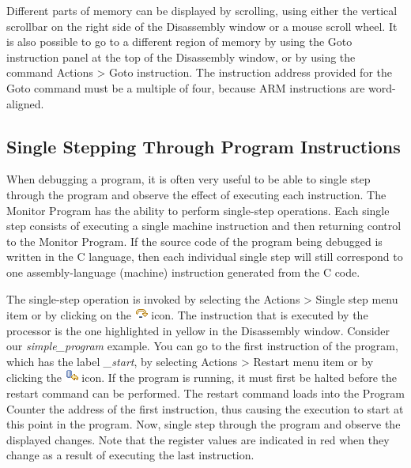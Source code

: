 \documentclass[11pt, twoside, pdftex]{article}
\begin{document}
Different parts of memory can be displayed by scrolling, 
using either the vertical scrollbar on the right side of the Disassembly window or a mouse scroll wheel.
It is also possible to go to a different region of memory by 
using the \textsf{Goto instruction} panel 
at the top of the Disassembly window, or by using the command \textsf{Actions > Goto instruction}.  The instruction address
provided for the {\sf Goto} command must be a multiple of four,
because ARM instructions are word-aligned. 


\subsection{Single Stepping Through Program Instructions}
\label{sec:3.5}

When debugging a program, it is often very useful to be able
to single step through the program and observe the effect of
executing each instruction. 
The Monitor Program has the ability to perform single-step
operations. Each single step consists of executing a single
machine instruction and then returning control to the Monitor
Program. If the source code of the program being debugged is
written in the C language, then each individual single step will
still correspond to one assembly-language (machine) instruction
generated from the C code. 

The single-step operation is invoked by selecting the
\textsf{Actions > Single step} menu item or by clicking on the \includegraphics{toolbar/singlestep.png} icon. The 
instruction that is executed by the processor is the
one highlighted in yellow in the \textsf{Disassembly} window.
Consider our {\it simple\_program} example. You can go to the
first instruction of the program, which has the label 
{\it \_start}, by selecting \textsf{Actions > Restart} 
menu item or by clicking  
the \includegraphics{toolbar/restart.png} icon. If the program is
running, it must first be halted before the restart 
command can be performed.
The restart command loads into the Program Counter the address of
the first instruction, thus causing the execution to start at
this point in the program.
Now, single step through the program and observe the displayed 
changes. Note that the register values are indicated in red when
they change as a result of executing the last instruction.
\end{document}
